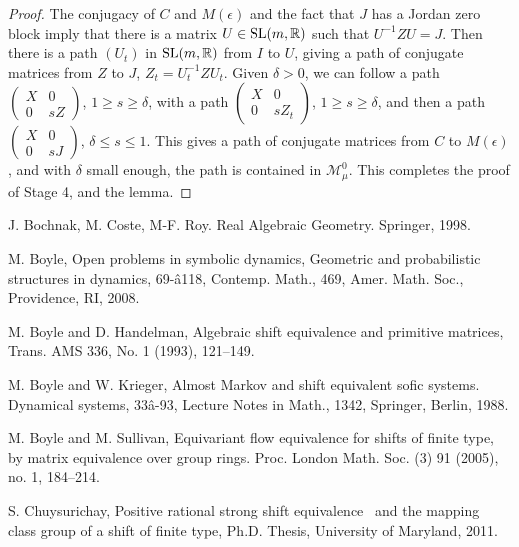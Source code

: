 \documentclass{amsart}
\theoremstyle{definition}
\theoremstyle{remark}
\numberwithin{equation}{section}
\begin{document}
{{\begin{proof}
The conjugacy of $C$ and $M(\epsilon )$  
and the fact that $J$ has a Jordan 
zero block imply that there is a matrix 
$U \in \textnormal{SL}(m, \mathbb R)$ such that    
$U^{-1}ZU=J$.  Then there is a path 
$(U_t)$ in  
$ \textnormal{SL}(m, \mathbb R)$ from $I$ to 
$U$, giving a path of conjugate matrices 
from $Z$ to $J$, 
$Z_t= U_t^{-1}ZU_t$. Given $\delta >0$, 
we can follow a path 
$\left(\begin{smallmatrix} X & 0 \\ 0 & sZ 
\end{smallmatrix} \right)$, $1\geq s\geq \delta$,  
with a path 
$\left(\begin{smallmatrix} X & 0 \\ 0 & sZ_t 
\end{smallmatrix} \right)$, $1\geq s\geq \delta$,  
and then a path 
$\left(\begin{smallmatrix} X & 0 \\ 0 & sJ 
\end{smallmatrix} \right)$, $\delta \leq s\leq 1$. 
This gives a path of conjugate matrices from 
$C$ to $M(\epsilon )$, and with  $\delta $ 
small enough,  the path is contained in  
$\mathcal M^0_{\mu}$.   
  This completes the proof of 
Stage 4, and the lemma. 

\end{proof} 

\begin{thebibliography}{99}

 J. Bochnak, M. Coste, M-F. Roy. 
Real Algebraic Geometry. Springer, 1998. 

 M. Boyle, Open problems in symbolic dynamics, 
Geometric and probabilistic structures in dynamics, 69-â118,
Contemp. Math., 469, Amer. Math. Soc., Providence, RI, 2008. 

 M. Boyle and D. Handelman,
Algebraic shift equivalence and primitive matrices,
Trans. AMS 336, No. 1 (1993), 121--149. 

M. Boyle and W. Krieger, 
Almost Markov and shift equivalent sofic systems. 
Dynamical systems, 33â-93, 
Lecture Notes in Math., 1342, Springer, Berlin, 1988.

M. Boyle and M.  Sullivan, 
Equivariant flow equivalence for shifts of finite type, 
by matrix equivalence over group rings.
Proc. London Math. Soc. (3) 91 (2005), no. 1, 184--214.

 S. Chuysurichay, Positive rational strong shift equivalence \
and the mapping class group of a shift of finite type, Ph.D. Thesis, 
University of Maryland, 2011. 


\end{thebibliography}}}
\end{document}
